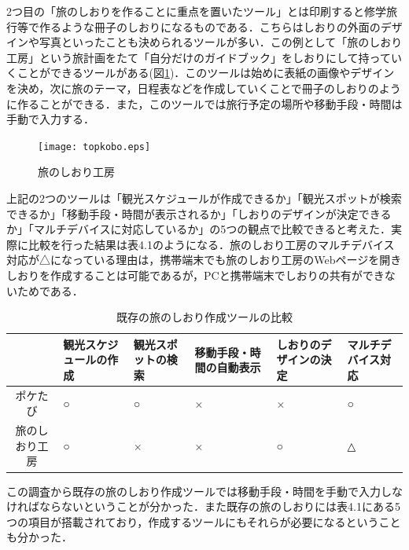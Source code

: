 \documentclass{funthesis}
\begin{document}
2つ目の「旅のしおりを作ることに重点を置いたツール」とは印刷すると修学旅行等で作るような冊子のしおりになるものである．こちらはしおりの外面のデザインや写真といったことも決められるツールが多い．この例として「旅のしおり工房」\cite{tripkobo}という旅計画をたて「自分だけのガイドブック」をしおりにして持っていくことができるツールがある(図\ref{Ltopkobo})．このツールは始めに表紙の画像やデザインを決め，次に旅のテーマ，日程表などを作成していくことで冊子のしおりのように作ることができる．また，このツールでは旅行予定の場所や移動手段・時間は手動で入力する．

\begin{figure}[htpb]
\begin{center}
\texttt{[image: topkobo.eps]}
\end{center}
\caption{旅のしおり工房}
\label{Ltopkobo}
\end{figure}

上記の2つのツールは「観光スケジュールが作成できるか」「観光スポットが検索できるか」「移動手段・時間が表示されるか」「しおりのデザインが決定できるか」「マルチデバイスに対応しているか」の5つの観点で比較できると考えた．実際に比較を行った結果は表4.1のようになる．旅のしおり工房のマルチデバイス対応が△になっている理由は，携帯端末でも旅のしおり工房のWebページを開きしおりを作成することは可能であるが，PCと携帯端末でしおりの共有ができないためである．


\begin{table}[htb]
\begin{center}
\caption{既存の旅のしおり作成ツールの比較}
  \begin{tabular}{|c|p{2.0cm}|p{2.0cm}|p{2.0cm}|p{2.0cm}|p{2.0cm}|} \hline
     & 観光スケジュールの作成 & 観光スポットの検索 & 移動手段・時間の自動表示 & しおりのデザインの決定 & マルチデバイス対応 \\ \hline 
    ポケたび & ○ & ○ & × & × & ○ \\ \hline
    旅のしおり工房 & ○ & × & × & ○ & △\\ \hline
  \end{tabular}
  \end{center}
\end{table}


この調査から既存の旅のしおり作成ツールでは移動手段・時間を手動で入力しなければならないということが分かった．また既存の旅のしおりには表4.1にある5つの項目が搭載されており，作成するツールにもそれらが必要になるということも分かった．\\
\end{document}
